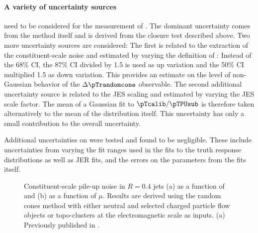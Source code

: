 \paragraph{A variety of uncertainty sources} need to be considered for the measurement of \Npileup. The dominant uncertainty comes from the method itself and is derived from the closure test described above. Two more uncertainty sources are considered:
The first is related to the extraction of the constituent-scale noise and estimated by varying the definition of \sigmaRC: Instead of the 68\% CI, the 87\% CI divided by 1.5 is used as up variation and the 50\% CI multiplied 1.5 as down variation. This provides an estimate on the level of non-Gaussian behavior of the $\Delta \pTrandomcone$ observable. The second additional uncertainty source is related to the JES scaling and estimated by varying the JES scale factor. The mean of a Gaussian fit to $\pTcalib / \pTPUsub$ is therefore taken alternatively to the mean of the distribution itself. This uncertainty has only a small contribution to the overall uncertainty.

Additional uncertainties on \Npileup were tested and found to be negligible. These include uncertainties from varying the fit ranges used in the fits to the truth response distributions as well as JER fits, and the errors on the parameters from the fits itself.



\begin{figure}[t]
    \caption{Constituent-scale pile-up noise in \antikt $R=0.4$ jets (a) as a function of \absetadet and (b) as a function of $\mu$. Results are derived using the random cones method with either neutral and selected charged particle flow objects or topo-clusters at the electromagnetic scale as inputs. (a)
        Previously published in .}
    \label{fig:const-scale-noise-results}
\end{figure}

